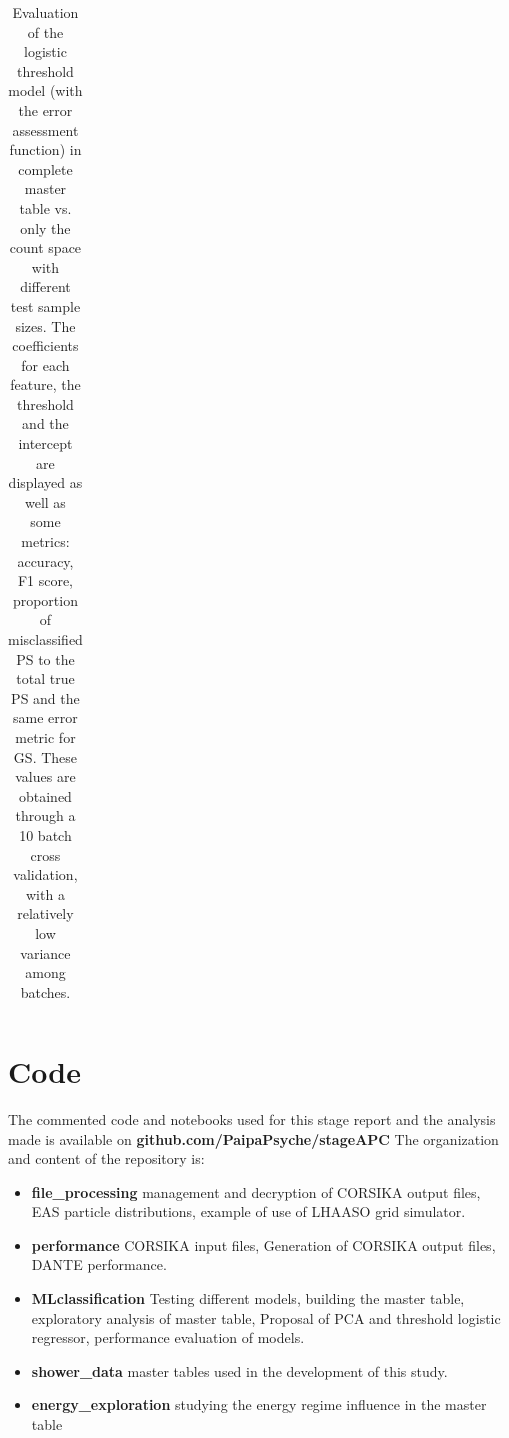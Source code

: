 \documentclass{article}
\begin{document}
\begin{appendices}
\begin{table}[!h]
\begin{tabular}[]{l|ccc|ccc}
\end{tabular}

\caption{Evaluation of the logistic threshold model (with the error assessment function) in complete master table vs. only the count space with different test sample sizes. The coefficients for each feature, the threshold and the intercept are displayed as well as some metrics: accuracy, F1 score, proportion of misclassified PS to the total true PS and the same error metric  for GS. These values are obtained through a 10 batch cross validation, with a relatively low variance among batches. }
\label{tab:log_prob_test_size}
\end{table}
\section{Code}
The commented code and notebooks used for this stage report and the analysis made is available on \textbf{github.com/PaipaPsyche/stageAPC}
The organization and content of the repository is: 
\begin{itemize}
    \item \textbf{file\_processing} management and decryption of CORSIKA output files, EAS particle distributions, example of use of LHAASO grid simulator.
    \item \textbf{performance} CORSIKA input files, Generation of CORSIKA output files, DANTE performance. 
    \item \textbf{MLclassification} Testing different models, building the master table, exploratory analysis of master table, Proposal of PCA and threshold logistic regressor, performance evaluation of models.
    \item \textbf{shower\_data} master tables used in the development of this study.
    \item \textbf{energy\_exploration} studying the energy regime influence in the master table
\end{itemize}
\end{appendices}
\end{document}
